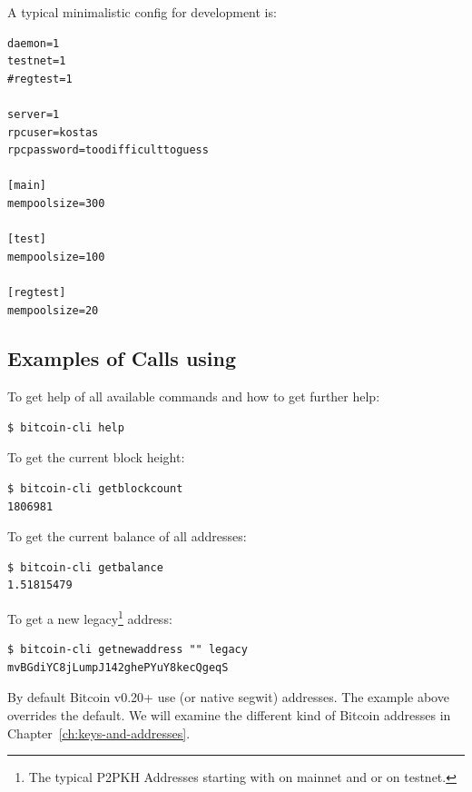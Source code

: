 A typical minimalistic config for development is:
\begin{emphbox}
\begin{lstlisting}[style=Bash]
daemon=1
testnet=1
#regtest=1

server=1
rpcuser=kostas
rpcpassword=toodifficulttoguess

[main]
mempoolsize=300

[test]
mempoolsize=100

[regtest]
mempoolsize=20
\end{lstlisting}
\end{emphbox}


\subsection*{Examples of Calls using }

To get help of all available commands and how to get further help:
\begin{emphbox}
\begin{lstlisting}[style=Bash]
$ bitcoin-cli help
\end{lstlisting}
\end{emphbox}
\vspace{1em}

\noindent To get the current block height:
\begin{emphbox}
\begin{lstlisting}[style=Bash]
$ bitcoin-cli getblockcount
1806981
\end{lstlisting}
\end{emphbox}
\vspace{1em}

\noindent To get the current balance of all addresses:
\begin{emphbox}
\begin{lstlisting}[style=Bash]
$ bitcoin-cli getbalance
1.51815479
\end{lstlisting}
\end{emphbox}
\vspace{1em}

\noindent To get a new legacy\footnote{The typical P2PKH Addresses starting with  on mainnet and  or  on testnet.} address:
\begin{emphbox}
\begin{lstlisting}[style=Bash]
$ bitcoin-cli getnewaddress "" legacy
mvBGdiYC8jLumpJ142ghePYuY8kecQgeqS
\end{lstlisting}
\end{emphbox}
\noindent By default Bitcoin v0.20+ use  (or native segwit) addresses. The example above overrides the default. We will examine the different kind of Bitcoin addresses in Chapter~\ref{ch:keys-and-addresses}.
\vspace{1em}

